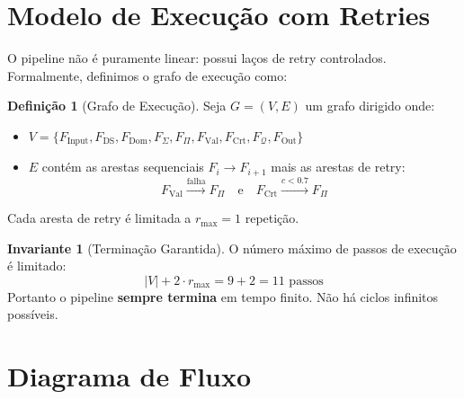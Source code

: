 \documentclass[a4paper, 12pt]{report}
\theoremstyle{definition}
\newtheorem{definicao}{Defini\c{c}\~ao}[chapter]
\newtheorem{invariante}{Invariante}[chapter]
\theoremstyle{remark}
\newcommand{\fila}{\mathcal{Q}}
\begin{document}
\section{Modelo de Execu\c{c}\~ao com Retries}

O pipeline n\~ao \'e puramente linear: possui la\c{c}os de retry controlados.
Formalmente, definimos o grafo de execu\c{c}\~ao como:

\begin{definicao}[Grafo de Execu\c{c}\~ao]
  Seja $G = (V, E)$ um grafo dirigido onde:
  \begin{itemize}
    \item $V = \{F_{\text{Input}}, F_{\text{DS}}, F_{\text{Dom}}, F_{\Sigma},
      F_{\Pi}, F_{\text{Val}}, F_{\text{Crt}}, F_{\fila}, F_{\text{Out}}\}$
    \item $E$ cont\'em as arestas sequenciais $F_i \to F_{i+1}$ mais as
      arestas de retry:
      \[
        F_{\text{Val}} \xrightarrow{\text{falha}} F_{\Pi} \quad \text{e} \quad
        F_{\text{Crt}} \xrightarrow{c < 0.7} F_{\Pi}
      \]
  \end{itemize}
  Cada aresta de retry \'e limitada a $r_{\max} = 1$ repeti\c{c}\~ao.
\end{definicao}

\begin{invariante}[Termina\c{c}\~ao Garantida]
  O n\'umero m\'aximo de passos de execu\c{c}\~ao \'e limitado:
  \[
    |V| + 2 \cdot r_{\max} = 9 + 2 = 11 \text{ passos}
  \]
  Portanto o pipeline \textbf{sempre termina} em tempo finito.
  N\~ao h\'a ciclos infinitos poss\'iveis.
\end{invariante}


\section{Diagrama de Fluxo}
\end{document}
